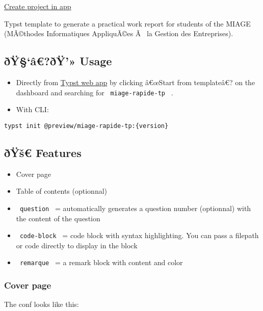 \href{/app?template=miage-rapide-tp&version=0.1.2}{Create project in
app}

\label{readme}
Typst template to generate a practical work report for students of the
MIAGE (MÃ©thodes Informatiques AppliquÃ©es Ã~ la Gestion des
Entreprises).

\subsection{ðŸ§`â€?ðŸ'» Usage}\label{uxf0uxffuxe2uxf0uxff-usage}

\begin{itemize}
\item
  Directly from \href{https://typst.app/}{Typst web app} by clicking
  â€œStart from templateâ€? on the dashboard and searching for
  \texttt{\ miage-rapide-tp\ } .
\item
  With CLI:
\end{itemize}

\begin{verbatim}
typst init @preview/miage-rapide-tp:{version}
\end{verbatim}

\subsection{ðŸš€ Features}\label{uxf0uxffux161-features}

\begin{itemize}
\tightlist
\item
  Cover page
\item
  Table of contents (optionnal)
\item
  \texttt{\ question\ } = automatically generates a question number
  (optionnal) with the content of the question
\item
  \texttt{\ code-block\ } = code block with syntax highlighting. You can
  pass a filepath or code directly to display in the block
\item
  \texttt{\ remarque\ } = a remark block with content and color
\end{itemize}

\subsubsection{Cover page}\label{cover-page}

The conf looks like this:

\begin{Shaded}
\begin{Highlighting}[]
\NormalTok{)}
\end{Highlighting}
\end{Shaded}

